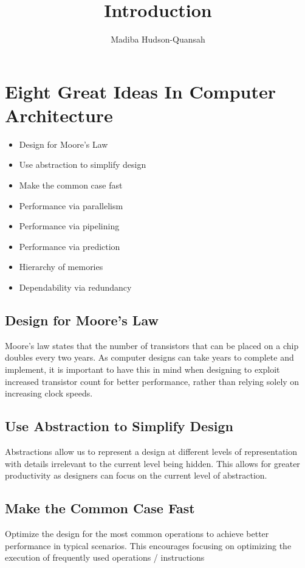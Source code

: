 \documentclass[12pt letter]{report}
\title{\Huge{Introduction}}
\author{\huge{Madiba Hudson-Quansah}}
\date{}
\begin{document}
\maketitle
\newpage
{}
\tableofcontents
\pagebreak


\chapter{Eight Great Ideas In Computer Architecture}

\begin{itemize}
  \item Design for Moore's Law
  \item Use abstraction to simplify design
  \item Make the common case fast
  \item Performance via parallelism
  \item Performance via pipelining
  \item Performance via prediction
  \item  Hierarchy of memories
  \item Dependability via redundancy
\end{itemize}

\section{Design for Moore's Law}
Moore's law states that the number of transistors that can be placed on a chip doubles every two years. As computer
designs can take years to complete and implement, it is important to have this in mind when designing to exploit
increased transistor count for better performance, rather than relying solely on increasing clock speeds.

\section{Use Abstraction to Simplify Design}
Abstractions allow us to represent a design at different levels of representation with details irrelevant to the current
level being hidden. This allows for greater productivity as  designers can focus on the current level of abstraction.

\section{Make the Common Case Fast}
Optimize the design for the most common operations to achieve better performance in typical scenarios. This encourages
focusing on optimizing the execution of frequently used operations / instructions
\end{document}
